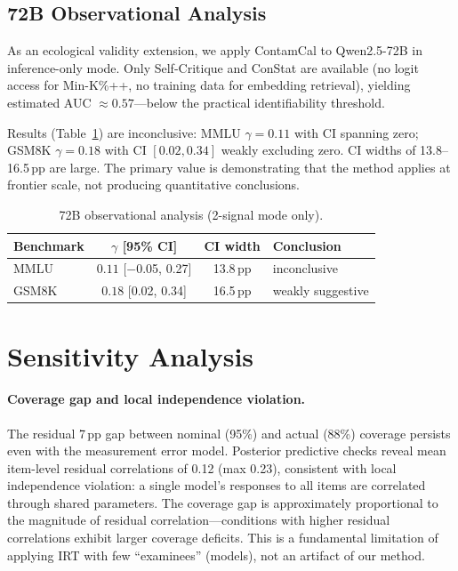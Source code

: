 \documentclass[letterpaper]{article}
\begin{document}
\subsection{72B Observational Analysis}
\label{sec:72b}

As an ecological validity extension, we apply ContamCal to Qwen2.5-72B in inference-only mode.
Only Self-Critique and ConStat are available (no logit access for Min-K\%++, no training data for embedding retrieval), yielding estimated AUC ${\approx} 0.57$---below the practical identifiability threshold.

Results (Table~\ref{tab:72b}) are inconclusive: MMLU $\gamma{=}0.11$ with CI spanning zero; GSM8K $\gamma{=}0.18$ with CI $[0.02, 0.34]$ weakly excluding zero.
CI widths of 13.8--16.5\,pp are large.
The primary value is demonstrating that the method applies at frontier scale, not producing quantitative conclusions.

\begin{table}[t]
\centering
\caption{72B observational analysis (2-signal mode only).}
\label{tab:72b}
\begin{tabular}{lccl}
\toprule
\textbf{Benchmark} & $\gamma$ \textbf{[95\% CI]} & \textbf{CI width} & \textbf{Conclusion} \\
\midrule
MMLU & $0.11$ [$-$0.05, 0.27] & 13.8\,pp & inconclusive \\
GSM8K & $0.18$ [0.02, 0.34] & 16.5\,pp & weakly suggestive \\
\bottomrule
\end{tabular}
\end{table}

\section{Sensitivity Analysis}
\label{sec:sensitivity}

\paragraph{Coverage gap and local independence violation.}
The residual 7\,pp gap between nominal (95\%) and actual (88\%) coverage persists even with the measurement error model.
Posterior predictive checks reveal mean item-level residual correlations of 0.12 (max 0.23), consistent with local independence violation: a single model's responses to all items are correlated through shared parameters.
The coverage gap is approximately proportional to the magnitude of residual correlation---conditions with higher residual correlations exhibit larger coverage deficits.
This is a fundamental limitation of applying IRT with few ``examinees'' (models), not an artifact of our method.
\end{document}
